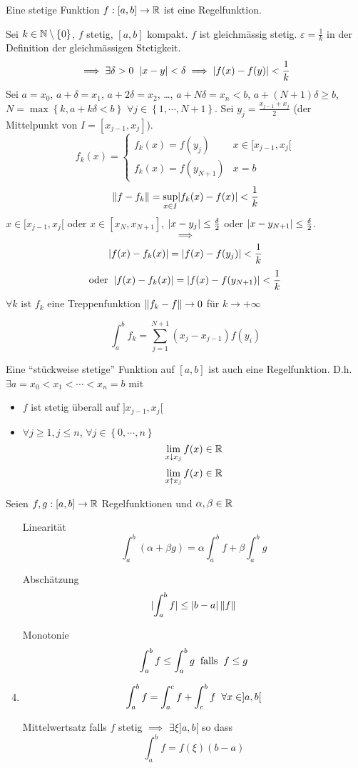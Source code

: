 \begin{Sat}
  Eine stetige Funktion $f:[a,b]\to\mathbb{R}$ ist eine Regelfunktion.
\end{Sat}
\begin{Bew}
  Sei $k\in\mathbb{N}\setminus\left\{ 0 \right\}$, $f$ stetig, $[a,b]$ kompakt. $f$ ist gleichmässig stetig. $\varepsilon=\frac{1}{k}$ in der Definition der gleichmässigen Stetigkeit.
  \[\implies\exists\delta>0\hspace{2mm}\mathopen| x-y \mathclose|<\delta\implies\mathopen| f(x)-f(y) \mathclose|<\frac{1}{k}\]
  Sei $a=x_0$, $a+\delta=x_1$, $a+2\delta=x_2$, \ldots, $a+N\delta=x_n<b$, $a+(N+1)\delta\geq b$, $N=\max\left\{ k,a+k\delta<b \right\}$ $\forall j\in\left\{ 1,\cdots,N+1 \right\}$. Sei $y_j=\frac{x_{j-1}+x_j}{2}$ (der Mittelpunkt von $I=[x_{j-1},x_j]$).
  \[ f_k(x)= \begin{cases}
    f_k(x)=f(y_j)& x\in [x_{j-1},x_j[\\
    f_k(x)=f(y_{N+1})&x=b
  \end{cases}\]
  \[\left\| f-f_k \right\|=\sup_{x\in I}\mathopen| f_k(x)-f(x) \mathclose|<\frac{1}{k}\]
  $x\in [x_{j-1},x_j[$ oder $x\in [x_N,x_{N+1}]$, $\mathopen| x-y_j \mathclose|\leq \frac{\delta}{2}$ oder $\mathopen| x-y_{N+1} \mathclose|\leq \frac{\delta}{2}$.
  \[\implies\]
  \[\mathopen| f(x)-f_k(x) \mathclose|=\mathopen| f(x)-f(y_j) \mathclose|<\frac{1}{k}\]
  \[\text{oder}\hspace{2mm}\mathopen| f(x)-f_k(x) \mathclose|=\mathopen| f(x)-f(y_{N+1}) \mathclose|<\frac{1}{k}\]
  $\forall k$ ist $f_k$ eine Treppenfunktion $\left\| f_k-f \right\|\to 0$ für $k\to+\infty$
\end{Bew}
\begin{Bem}
  \[\int_a^bf_k=\sum_{j=1}^{N+1}(x_j-x_{j-1})f(y_i)\]
\end{Bem}
\begin{Kor}
  Eine ``stückweise stetige'' Funktion auf $[a,b]$ ist auch eine Regelfunktion. D.h. $\exists a=x_0<x_1<\cdots<x_n=b$ mit
  \begin{itemize}
    \item $f$ ist stetig überall auf $]x_{j-1}, x_j[$
    \item $\forall j\geq 1, j\leq n$, $\forall j\in \left\{ 0,\cdots,n \right\}$
      \[\lim_{x\downarrow x_j}f(x)\in\mathbb{R}\]
      \[\lim_{x\uparrow x_j}f(x)\in\mathbb{R}\]
  \end{itemize}
\end{Kor}
\begin{theorem}
  Seien $f,g:[a,b]\to\mathbb{R}$ Regelfunktionen und $\alpha,\beta\in\mathbb{R}$
  \begin{enumerate}
    \item[Linearität]
      \[\int_a^b(\alpha + \beta g)=\alpha\int_a^bf+\beta\int_a^bg\]
    \item[Abschätzung]
      \[\mathopen| \int_a^bf \mathclose|\leq\mathopen| b-a \mathclose|\left\| f \right\|\]
    \item[Monotonie]
      \[\int_a^bf\leq\int_a^bg\hspace{2mm}\text{falls}\hspace{2mm} f\leq g\]
    \item
      \[\int_a^bf=\int_a^cf+\int_c^bf\hspace{2mm}\forall x\in ]a,b[\]
    \item[Mittelwertsatz]
      falls $f$ stetig $\implies$ $\exists\xi ]a,b[$ so dass
      \[\int_a^bf=f(\xi)(b-a)\]
  \end{enumerate}
\end{theorem}
